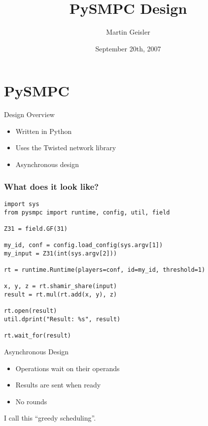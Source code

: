 \documentclass[t,noamsthm]{beamer}
\title{PySMPC Design}
\author{Martin Geisler}
\institute[BRICS]{
  BRICS\\
  Department of Computer Science\\
  University of Aarhus
}
\date{September 20th, 2007}
\begin{document}
\begin{frame}
  \titlepage
\end{frame}



\section{PySMPC}

\begin{frame}{Design Overview}

  \begin{itemize}
  \item Written in Python
  \item Uses the Twisted network library
  \item Asynchronous design
  \end{itemize}

\end{frame}


\begin{frame}[fragile]

\frametitle{What does it look like?}

\begin{lstlisting}
import sys
from pysmpc import runtime, config, util, field

Z31 = field.GF(31)

my_id, conf = config.load_config(sys.argv[1])
my_input = Z31(int(sys.argv[2]))

rt = runtime.Runtime(players=conf, id=my_id, threshold=1)

x, y, z = rt.shamir_share(input)
result = rt.mul(rt.add(x, y), z)

rt.open(result)
util.dprint("Result: %s", result)

rt.wait_for(result)
\end{lstlisting}

\end{frame}


\begin{frame}{Asynchronous Design}

  \begin{itemize}
  \item Operations wait on their operands
  \item Results are sent when ready
  \item No rounds
  \end{itemize}
  I call this ``greedy scheduling''.

\end{frame}
\end{document}
